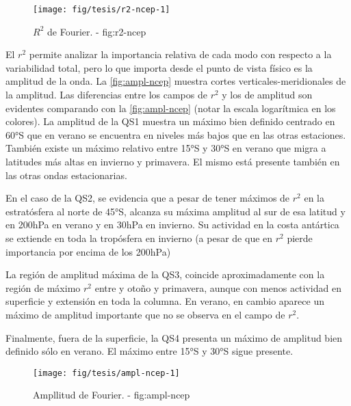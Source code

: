 \documentclass[spanish,a4paper,12p]{book}
\begin{document}
\begin{landscape}\begin{figure}

{\centering \texttt{[image: fig/tesis/r2-ncep-1]} 

}

\caption{$R^2$ de Fourier. - fig:r2-ncep}\label{fig:r2-ncep}
\end{figure}
\end{landscape}

El \(r^2\) permite analizar la importancia relativa de cada modo con
respecto a la variabilidad total, pero lo que importa desde el punto de
vista físico es la amplitud de la onda. La \autoref{fig:ampl-ncep}
muestra cortes verticales-meridionales de la amplitud. Las diferencias
entre los campos de \(r^2\) y los de amplitud son evidentes comparando
con la \autoref{fig:ampl-ncep} (notar la escala logarítmica en los
colores). La amplitud de la QS1 muestra un máximo bien definido centrado
en 60°S que en verano se encuentra en niveles más bajos que en las otras
estaciones. También existe un máximo relativo entre 15°S y 30°S en
verano que migra a latitudes más altas en invierno y primavera. El mismo
está presente también en las otras ondas estacionarias.

En el caso de la QS2, se evidencia que a pesar de tener máximos de
\(r^2\) en la estratósfera al norte de 45°S, alcanza su máxima amplitud
al sur de esa latitud y en 200hPa en verano y en 30hPa en invierno. Su
actividad en la costa antártica se extiende en toda la tropósfera en
invierno (a pesar de que en \(r^2\) pierde importancia por encima de los
200hPa)

La región de amplitud máxima de la QS3, coincide aproximadamente con la
región de máximo \(r^2\) entre y otoño y primavera, aunque con menos
actividad en superficie y extensión en toda la columna. En verano, en
cambio aparece un máximo de amplitud importante que no se observa en el
campo de \(r^2\).

Finalmente, fuera de la superficie, la QS4 presenta un máximo de
amplitud bien definido sólo en verano. El máximo entre 15°S y 30°S sigue
presente.

\begin{landscape}\begin{figure}

{\centering \texttt{[image: fig/tesis/ampl-ncep-1]} 

}

\caption{Ampllitud de Fourier. - fig:ampl-ncep}\label{fig:ampl-ncep}
\end{figure}
\end{landscape}
\end{document}
